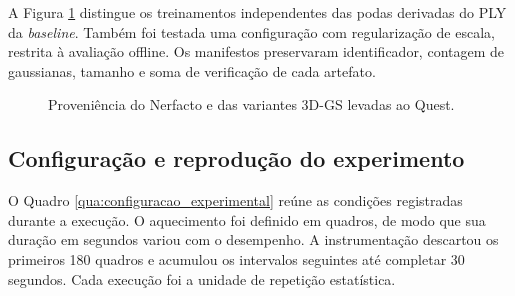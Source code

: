 A Figura \ref{fig:proveniencia_variantes_implementadas} distingue os treinamentos independentes das podas derivadas do PLY da \textit{baseline}. Também foi testada uma configuração com regularização de escala, restrita à avaliação offline. Os manifestos preservaram identificador, contagem de gaussianas, tamanho e soma de verificação de cada artefato.

\begin{figure}[H]
\centering
\caption{Proveniência do Nerfacto e das variantes 3D-GS levadas ao Quest.}
\label{fig:proveniencia_variantes_implementadas}
\end{figure}

\subsection{Configuração e reprodução do experimento}
\label{sec:configuracao_reproducao}

O Quadro \ref{qua:configuracao_experimental} reúne as condições registradas durante a execução. O aquecimento foi definido em quadros, de modo que sua duração em segundos variou com o desempenho. A instrumentação descartou os primeiros 180 quadros e acumulou os intervalos seguintes até completar 30 segundos. Cada execução foi a unidade de repetição estatística.

